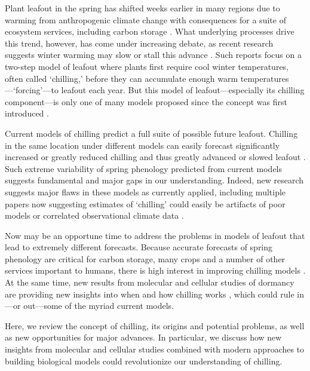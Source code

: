 \documentclass[11pt]{article}
\begin{document}
Plant leafout in the spring has shifted weeks earlier in many regions due to warming from anthropogenic climate change with consequences for a suite of ecosystem services, including carbon storage \citep{keenan2014net,ipcc2022}.  What underlying processes drive this trend, however, has come under increasing debate, as recent research suggests winter warming may slow or stall this advance \citep{fu2015,piao2017}. Such reports focus on a two-step model of leafout where plants first require cool winter temperatures, often called `chilling,' before they can accumulate enough warm temperatures---`forcing'---to leafout each year. But this model of leafout---especially its chilling component---is only one of many models proposed since the concept was first introduced \citep[at least 30 models are used today, see][]{basler2016evaluating,hufkens2018integrated}. 

Current models of chilling predict a full suite of possible future leafout. Chilling in the same location under different models can easily forecast significantly increased or greatly reduced chilling and thus greatly advanced or slowed leafout \citep{guy2014,chuine2016}. Such extreme variability of spring phenology predicted from current models suggests fundamental and major gaps in our understanding. Indeed, new research suggests major flaws in these models as currently applied, including multiple papers now suggesting estimates of `chilling' could easily be artifacts of poor models or correlated observational climate data \citep{decsens,gao2024}. 

Now may be an opportune time to address the problems in models of leafout that lead to extremely different forecasts. Because accurate forecasts of spring phenology are critical for carbon storage, many crops and a number of other services important to humans, there is high interest in improving chilling models \citep{Luedeling2015Acta,chuine2016}. At the same time, new results from molecular and cellular studies of dormancy are providing new insights into when and how chilling works \citep{pan2023epigenetic,zhu2021cold}, which could rule in---or out---some of the myriad current models. 

Here, we review the concept of chilling, its origins and potential problems, as well as new opportunities for major advances. In particular, we discuss how new insights from molecular and cellular studies combined with modern approaches to building biological models could revolutionize our understanding of chilling. 
\end{document}
